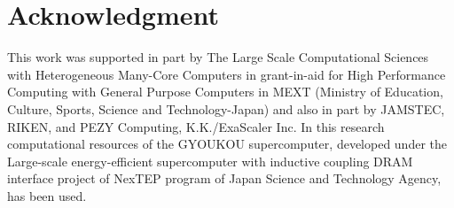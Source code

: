 \documentclass[conference]{IEEEtran}
\begin{document}


\section*{Acknowledgment}


This work was supported in part by The Large Scale Computational
Sciences with Heterogeneous Many-Core Computers in grant-in-aid for High
Performance Computing with General Purpose Computers in MEXT (Ministry
of Education, Culture, Sports, Science and Technology-Japan) and  also
in part by  JAMSTEC, RIKEN, and PEZY Computing,
K.K./ExaScaler Inc.
In this research computational resources of the GYOUKOU supercomputer,
developed under the Large-scale energy-efficient supercomputer with
inductive coupling DRAM interface project of NexTEP program of Japan
Science and Technology Agency, has been used.









%
%
%











\end{document}
